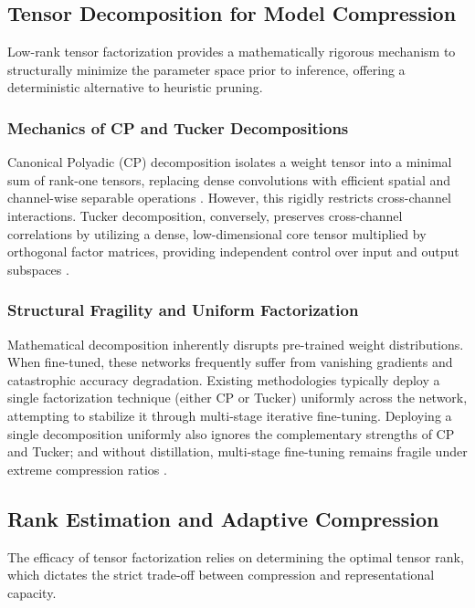 \documentclass[conference]{IEEEtran}
\begin{document}
\subsection{Tensor Decomposition for Model Compression}
\par
Low-rank tensor factorization provides a mathematically rigorous mechanism to structurally minimize the parameter space prior to inference, offering a deterministic alternative to heuristic pruning.


\subsubsection{Mechanics of CP and Tucker Decompositions}
\par
Canonical Polyadic (CP) decomposition isolates a weight tensor into a minimal sum of rank-one tensors, replacing dense convolutions with efficient spatial and channel-wise separable operations \cite{lebedev2014speeding}. However, this rigidly restricts cross-channel interactions. Tucker decomposition, conversely, preserves cross-channel correlations by utilizing a dense, low-dimensional core tensor multiplied by orthogonal factor matrices, providing independent control over input and output subspaces \cite{kim2015compression}.


\subsubsection{Structural Fragility and Uniform Factorization}
\par
Mathematical decomposition inherently disrupts pre-trained weight distributions. When fine-tuned, these networks frequently suffer from vanishing gradients and catastrophic accuracy degradation. Existing methodologies typically deploy a single factorization technique (either CP or Tucker) uniformly across the network, attempting to stabilize it through multi-stage iterative fine-tuning. Deploying a single decomposition uniformly also ignores the complementary strengths of CP and Tucker; and without distillation, multi-stage fine-tuning remains fragile under extreme compression ratios \cite{gusak2019automated}.


\subsection{Rank Estimation and Adaptive Compression}
\par
The efficacy of tensor factorization relies on determining the optimal tensor rank, which dictates the strict trade-off between compression and representational capacity.
\end{document}
